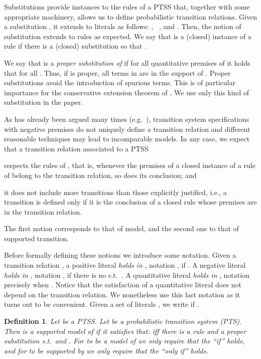 \documentclass[submission,copyright,creativecommons]{eptcs}
\newtheorem{definition}{Definition}
\begin{document}
Substitutions provide instances to the rules of a PTSS that, together
with some appropriate machinery, allows us to define probabilistic
transition relations.  Given a substitution , it extends to
literals as follows:
, \
, and
.
Then, the notion of substitution extends to rules as expected.  We say
that  is a (closed) instance of a rule  if there is a
(closed) substitution  so that .


 We say that  is a \emph{proper substitution of } if for all
 quantitative premises  of  it holds that
  for all .  Thus, if  is proper, all
 terms in  are in the support of .  Proper
 substitutions avoid the introduction of spurious terms.  This is of
 particular importance for the conservative extension theorem of
 \cite[Theorem~14]{DL-fossacs12}.
We use only this kind of substitution in the paper. 



As has already been argued many times (e.g.~\cite{Groote93,BolGroote96,vanGlabbeek04}), transition system
specifications with negative premises do not uniquely define a
transition relation and different reasonable techniques may lead to
incomparable models.
In any case, we expect that a transition relation associated to a PTSS

\begin{inparaenum}[(i)]
\item respects the rules of , that is, whenever the premises of a
  closed instance of a rule of  belong to the transition relation,
  so does its conclusion; and
\item it does not include more transitions than those explicitly
  justified, i.e., a transition is defined only if it is the conclusion of a
  closed rule whose premises are in the transition relation.
\end{inparaenum}
The first notion corresponds to that of model, and the second one to
that of supported transition.

Before formally defining these notions we introduce some notation.
Given a transition relation , a positive
literal  \emph{holds in} , notation
, if .
A negative literal   \emph{holds in} ,
notation ,
if there is no  s.t.\ .
A quantitative literal  \emph{holds in} ,
notation  precisely when .  Notice that the satisfaction of a quantitative literal
does not
depend on the transition relation. We nonetheless
use this last notation as it turns out to be convenient.
Given a set of literals , we write 
if .

\begin{definition}\label{def:supmodel}Let  be a PTSS. Let  be
  a probabilistic transition system (PTS). Then  is \emph{a
   supported model of}  if
it satisfies that:  iff there is a rule
   and a proper substitution 
  s.t.\  and .
For  to be a \emph{model} of  we only require that
   the ``if'' holds, and for  to be
   \emph{supported by}  we only require that the ``only if'' holds.
\end{definition}
\end{document}
